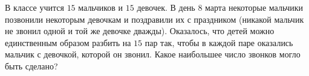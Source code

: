 \begin{exersize}
	В классе учится $15$ мальчиков и $15$ девочек. В день $8$ марта некоторые мальчики позвонили некоторым девочкам 
	и поздравили их с праздником (никакой мальчик не звонил одной и той же девочке дважды). 
	Оказалось, что детей можно единственным образом разбить на $15$ пар так, чтобы в каждой паре оказались 
	мальчик с девочкой, которой он звонил. Какое наибольшее число звонков могло быть сделано?
\end{exersize}	  

